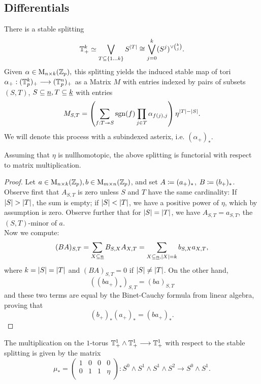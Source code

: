  \subsection{Differentials}
    \begin{lem}\label{lem_decomp_matrix}\cite[Remark 3.2]{carlsson2011higher}
      There is a stable splitting %
      $$\sT_+^k \simeq \bigvee_{T \subseteq \{1 \ldots k \} } S^{\abs{T}} \cong %
      \bigvee_{j = 0}^k (S^j)^{\vee\binom{k}{j}}.$$
      \comm{[geometric torus $(=\bR^n/\bZ^n)$? fix notation!} Given $\alpha \in \mathrm{M}_{n \times k}(\mathbb{Z}_p),$ this splitting yields the induced stable map of tori
      $\alpha_+: (\mathbb{T}^k_p)_+ \longrightarrow (\mathbb{T}^n_p)_+$ as a Matrix $M$ with entries indexed by pairs of subsets
      $(S,T)$, $S \subseteq \underline{n}, T \subseteq \underline{k}$ with entries%
      $$ M_{S,T} = \left( \sum_{f:T \twoheadrightarrow S} \operatorname{sgn}(f) \prod_{j \in T} \alpha_{f(j),j} \right) \eta^{\left\vert T\right\vert - \left\vert S\right\vert}.$$
      We will denote this process with a subindexed asterix, i.e. $(\alpha_+)_*$.%
    \end{lem}
    \begin{lem}\label{lem_decomp_matrix_funct}
      Assuming that $\eta$ is nullhomotopic, the above splitting is functorial with respect to matrix multiplication.
      \begin{proof}
        Let $a \in \mathrm{M}_{n \times k}(\mathbb{Z}_p), b \in \mathrm{M}_{m \times n}(\mathbb{Z}_p)$, and
        set $A \coloneqq (a_+)_*$, $B \coloneqq (b_+)_*$. Observe first that $A_{S,T}$
        is zero unless $S$ and $T$ have the same cardinality: If $\left\vert S\right\vert >
        \left\vert T\right\vert$, the sum is empty; if $\left\vert S\right\vert < \left\vert T\right\vert$, we have a positive
        power of $\eta$, which by assumption is zero. Observe further that for
        $\left\vert S\right\vert = \left\vert T\right\vert$, we have $A_{S,T} = a_{S,T}$, the $(S,T)$-minor of
        $a$.\\
        Now we compute:
        $$(BA)_{S,T} = \sum_{X \subseteq \ind{n}} B_{S,X} A_{X,T} = %
        \sum_{X
        \subseteq \ind{n}, \abs{X} = k} b_{S,X} a_{X,T},$$
        where $k = \left\vert S\right\vert = \left\vert T\right\vert$ and $(BA)_{S,T} = 0$ if $\left\vert S\right\vert \neq \left\vert T\right\vert$. On the other hand,
        $$((ba_+)_*)_{S,T} = (ba)_{S,T}$$ and these two terms are equal by the Binet-Cauchy formula from linear algebra, proving that%
        $$ (b_+)_*(a_+)_* = (ba_+)_*.$$
      \end{proof}
    \end{lem}
    \begin{lem}\label{lem_decomp_mult_2}\cite[Lemma 3.1]{carlsson2011higher}
      The multiplication on the $1$-torus $\mathbb{T}^1_+ \wedge \mathbb{T}^1_+ \longrightarrow \mathbb{T}^1_+$ with respect to the stable splitting is given by the matrix
      \begin{equation}\label{eq_torus_mult_2}\mu_* = %
        \left( \begin{array}{cccc}
          1 & 0 & 0 & 0 \\
          0 & 1 & 1 & \eta \\
        \end{array} \right): S^0 \wedge S^1 \wedge S^1 \wedge S^2 \to S^0 \wedge S^1 .\end{equation}
      \end{lem}
